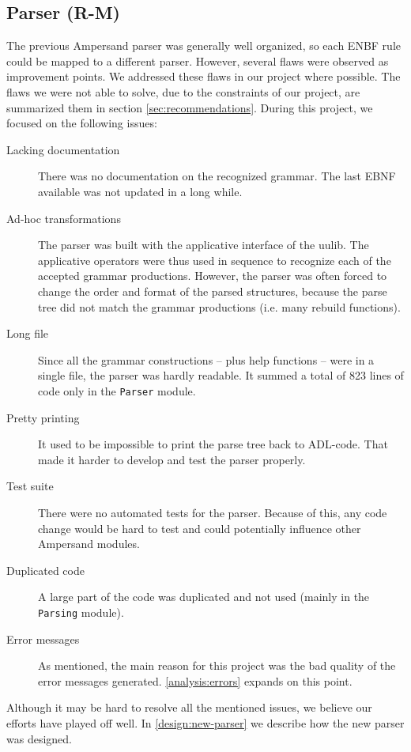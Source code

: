 
\subsection{Parser (R-M)}
\label{analysis:parser}
The previous Ampersand parser was generally well organized, so each ENBF rule could be mapped to a different parser.
However, several flaws were observed as improvement points.
We addressed these flaws in our project where possible.
The flaws we were not able to solve, due to the constraints of our project, are summarized them in section \autoref{sec:recommendations}.
During this project, we focused on the following issues:
\begin{description}
  \item[Lacking documentation]
    There was no documentation on the recognized grammar.
    The last EBNF available was not updated in a long while.
  
  \item[Ad-hoc transformations]
    The parser was built with the applicative interface of the uulib.
    The applicative operators were thus used in sequence to recognize each of the accepted grammar productions.
    However, the parser was often forced to change the order and format of the parsed structures, because the parse tree did not match the grammar productions (i.e. many rebuild functions).
    
  \item[Long file]
    Since all the grammar constructions -- plus help functions -- were in a single file, the parser was hardly readable.
    It summed a total of 823 lines of code only in the \texttt{Parser} module.
  
  \item[Pretty printing]
    It used to be impossible to print the parse tree back to ADL-code.
    That made it harder to develop and test the parser properly.
  
  \item[Test suite]
    There were no automated tests for the parser.
    Because of this, any code change would be hard to test and could potentially influence other Ampersand modules.
  
  \item[Duplicated code]
    A large part of the code was duplicated and not used (mainly in the \texttt{Parsing} module).
  
  \item[Error messages]
    As mentioned, the main reason for this project was the bad quality of the error messages generated.
    \autoref{analysis:errors} expands on this point.
\end{description}
%
Although it may be hard to resolve all the mentioned issues, we believe our efforts have played off well.
In \autoref{design:new-parser} we describe how the new parser was designed.
